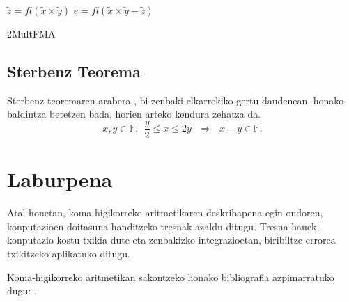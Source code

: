 \begin{algorithm}[H]
 \BlankLine
 {$\tilde{z}=fl(\tilde{x}\times\tilde{y})$\;
  $e=fl(\tilde{x}\times\tilde{y}- \tilde{z})$\;
 }
 \BlankLine
 \caption{2MultFMA}
 \label{alg:2MultFMA}
\end{algorithm}

\subsection*{Sterbenz Teorema}
Sterbenz teoremaren arabera \cite{Sterbenz1973}, bi zenbaki elkarrekiko  gertu daudenean, honako baldintza betetzen bada, horien arteko kendura zehatza da.
\begin{equation}
\label{eq:4311}
x,y \in \mathbb{F}, \ \ \frac{y}{2}\leq x \leq 2y \ \ \ \Rightarrow \ \ \ x-y\in \mathbb{F}.
\end{equation}


\section{Laburpena}

Atal honetan, koma-higikorreko aritmetikaren deskribapena egin ondoren, konputazioen doitasuna handitzeko tresnak azaldu ditugu. Tresna hauek, konputazio kostu txikia dute eta zenbakizko integrazioetan, biribiltze errorea txikitzeko aplikatuko ditugu.  

Koma-higikorreko aritmetikan sakontzeko honako bibliografia azpimarratuko dugu: \cite{Overton2001,Muller2009,Higham2002,Corless2013}.

